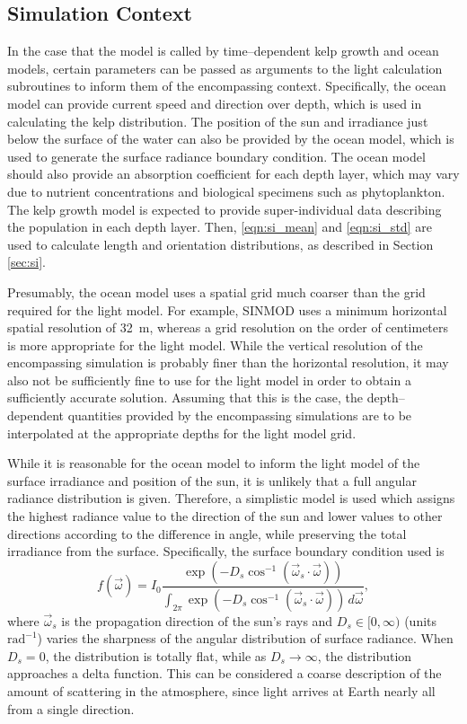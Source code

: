 \subsection{Simulation Context}
\label{sec:simulation_context}
In the case that the model is called by time--dependent kelp growth and ocean models, certain parameters can be passed as arguments to the light calculation subroutines to inform them of the encompassing context.
Specifically, the ocean model can provide current speed and direction over depth, which is used in calculating the kelp distribution.
The position of the sun and irradiance just below the surface of the water can also be provided by the ocean model, which is used to generate the surface radiance boundary condition.
The ocean model should also provide an absorption coefficient for each depth layer, which may vary due to nutrient concentrations and biological specimens such as phytoplankton.
The kelp growth model is expected to provide super-individual data describing the population in each depth layer.
Then, \eqref{eqn:si_mean} and \eqref{eqn:si_std} are used to calculate length and orientation distributions, as described in Section \ref{sec:si}.

Presumably, the ocean model uses a spatial grid much coarser than the grid required for the light model.
For example, SINMOD \cite{wassmann_modelling_2006} uses a minimum horizontal spatial resolution of \SI{32}{\m}, whereas a grid resolution on the order of centimeters is more appropriate for the light model.
While the vertical resolution of the encompassing simulation is probably finer than the horizontal resolution, it may also not be sufficiently fine to use for the light model in order to obtain a sufficiently accurate solution.
Assuming that this is the case, the depth--dependent quantities provided by the encompassing simulations are to be interpolated at the appropriate depths for the light model grid.

While it is reasonable for the ocean model to inform the light model of the surface irradiance and position of the sun, it is unlikely that a full angular radiance distribution is given.
Therefore, a simplistic model is used which assigns the highest radiance value to the direction of the sun and lower values to other directions according to the difference in angle, while preserving the total irradiance from the surface.
Specifically, the surface boundary condition used is
\begin{equation}
  f(\vec{\omega}) = I_0\frac{\exp\left( -D_s \cos^{-1}\left(\vec{\omega}_s \cdot \vec{\omega}\right) \right)}{\int_{2\pi}\exp\left( -D_s \cos^{-1}\left(\vec{\omega}_s \cdot \vec{\omega}\right) \right)\, d\vec{\omega}},
\end{equation} %
where $\vec{\omega}_s$ is the propagation direction of the sun's rays and $D_s\in[0, \infty)$ (units $\mbox{rad}^{-1}$) varies the sharpness of the angular distribution of surface radiance.
When $D_s=0$, the distribution is totally flat, while as $D_s \to \infty$, the distribution approaches a delta function.
This can be considered a coarse description of the amount of scattering in the atmosphere, since light arrives at Earth nearly all from a single direction.

